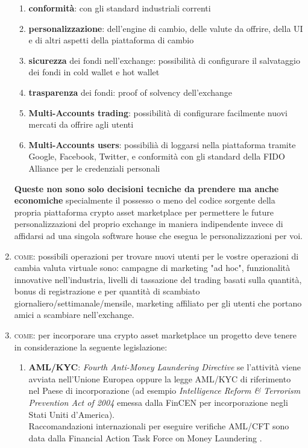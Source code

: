 \documentclass[11pt,fleqn,oneside]{book} %
\begin{document}
\begin{enumerate}
\begin{enumerate}[label*=\arabic*.]
			\item \textbf{conformità}: con gli standard industriali correnti
			\item \textbf{personalizzazione}: dell'engine di cambio, delle valute da offrire, della UI e di altri aspetti della piattaforma di cambio
			\item \textbf{sicurezza} dei fondi nell'exchange: possibilità di configurare il salvataggio dei fondi in cold wallet e hot wallet
			\item \textbf{trasparenza} dei fondi: proof of solvency dell'exchange
			\item \textbf{Multi-Accounts trading}: possibilità di configurare facilmente nuovi mercati da offrire agli utenti
			\item \textbf{Multi-Accounts users}: possibilià di loggarsi nella piattaforma tramite Google, Facebook, Twitter, e conformità
			con gli standard della FIDO Alliance per le credenziali personali
		\end{enumerate}	
	\textbf{Queste non sono solo decisioni tecniche da prendere ma anche economiche} specialmente il possesso o meno del codice sorgente della propria 
	piattaforma	crypto asset marketplace per permettere le future personalizzazioni del proprio exchange in maniera indipendente invece di affidarsi
	ad una singola software house che esegua le personalizzazioni per voi.
	\item \textsc{come}: possibili operazioni per trovare nuovi utenti per le vostre operazioni di cambia valuta virtuale sono:
	campagne di marketing "ad hoc", funzionalità innovative nell'industria, livelli di tassazione del trading basati sulla quantità, 
	bonus di registrazione e per quantità di scambiato giornaliero/settimanale/mensile, marketing affiliato per gli utenti che portano
	amici a scambiare nell'exchange.
	\item \textsc{come}: per incorporare una crypto asset marketplace un progetto deve tenere in considerazione la seguente legislazione:
		\begin{enumerate}[label*=\arabic*.]
			\item \textbf{AML/KYC}: \textit{Fourth Anti-Money Laundering Directive} se l'attività viene avviata nell'Unione Europea \cite{4AMLD} 
			oppure la legge AML/KYC di riferimento nel Paese di incorporazione (ad esempio \textit{Intelligence Reform \& Terrorism Prevention Act of 2004}
			emessa dalla FinCEN per incorporazione negli Stati Uniti d'America).\\
			Raccomandazioni internazionali per eseguire verifiche AML/CFT sono data dalla Financial Action Task Force on Money Laundering \cite{FATF}.

\end{enumerate}
\end{enumerate}
\end{document}
